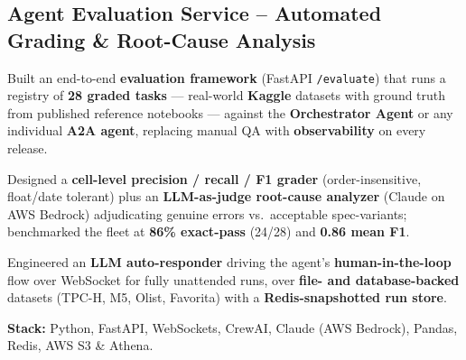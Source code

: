 \documentclass[letter,10pt]{article}
\begin{document}
\subsection{Agent Evaluation Service -- Automated Grading \& Root-Cause Analysis}
\begin{zitemize}
\item Built an end-to-end \textbf{evaluation framework} (FastAPI \texttt{/evaluate}) that runs a registry of \textbf{28 graded tasks} --- real-world \textbf{Kaggle} datasets with ground truth from published reference notebooks --- against the \textbf{Orchestrator Agent} or any individual \textbf{A2A agent}, replacing manual QA with \textbf{observability} on every release.
\item Designed a \textbf{cell-level precision / recall / F1 grader} (order-insensitive, float/date tolerant) plus an \textbf{LLM-as-judge root-cause analyzer} (Claude on AWS Bedrock) adjudicating genuine errors vs.\ acceptable spec-variants; benchmarked the fleet at \textbf{86\% exact-pass} (24/28) and \textbf{0.86 mean F1}.
\item Engineered an \textbf{LLM auto-responder} driving the agent's \textbf{human-in-the-loop} flow over WebSocket for fully unattended runs, over \textbf{file- and database-backed} datasets (TPC-H, M5, Olist, Favorita) with a \textbf{Redis-snapshotted run store}.
\item \textbf{Stack:} Python, FastAPI, WebSockets, CrewAI, Claude (AWS Bedrock), Pandas, Redis, AWS S3 \& Athena.
\end{zitemize}
\end{document}
